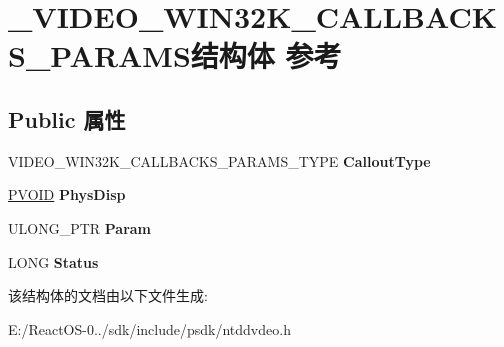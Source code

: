 \hypertarget{struct___v_i_d_e_o___w_i_n32_k___c_a_l_l_b_a_c_k_s___p_a_r_a_m_s}{}\section{\+\_\+\+V\+I\+D\+E\+O\+\_\+\+W\+I\+N32\+K\+\_\+\+C\+A\+L\+L\+B\+A\+C\+K\+S\+\_\+\+P\+A\+R\+A\+M\+S结构体 参考}
\label{struct___v_i_d_e_o___w_i_n32_k___c_a_l_l_b_a_c_k_s___p_a_r_a_m_s}
\subsection*{Public 属性}
\begin{DoxyCompactItemize}
\item 
\mbox{\label{struct___v_i_d_e_o___w_i_n32_k___c_a_l_l_b_a_c_k_s___p_a_r_a_m_s_a7b086d6a59436290227e7b61c7f14372}} 
V\+I\+D\+E\+O\+\_\+\+W\+I\+N32\+K\+\_\+\+C\+A\+L\+L\+B\+A\+C\+K\+S\+\_\+\+P\+A\+R\+A\+M\+S\+\_\+\+T\+Y\+PE {\bfseries Callout\+Type}
\item 
\mbox{\label{struct___v_i_d_e_o___w_i_n32_k___c_a_l_l_b_a_c_k_s___p_a_r_a_m_s_a9032f1f21851f74ae8a3915db2e2a837}} 
\hyperlink{interfacevoid}{P\+V\+O\+ID} {\bfseries Phys\+Disp}
\item 
\mbox{\label{struct___v_i_d_e_o___w_i_n32_k___c_a_l_l_b_a_c_k_s___p_a_r_a_m_s_a293135d779ab218f338a5125172a17ad}} 
U\+L\+O\+N\+G\+\_\+\+P\+TR {\bfseries Param}
\item 
\mbox{\label{struct___v_i_d_e_o___w_i_n32_k___c_a_l_l_b_a_c_k_s___p_a_r_a_m_s_a8debbdfc3db2981a4c6115991327c844}} 
L\+O\+NG {\bfseries Status}
\end{DoxyCompactItemize}


该结构体的文档由以下文件生成\+:\begin{DoxyCompactItemize}
\item 
E\+:/\+React\+O\+S-\/0../sdk/include/psdk/ntddvdeo.\+h\end{DoxyCompactItemize}

